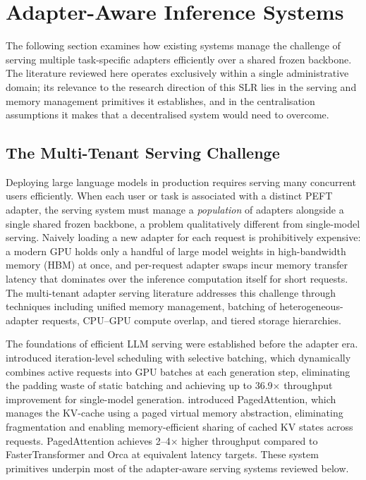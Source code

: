 \section{Adapter-Aware Inference Systems}
\label{sec:inference_systems}

The following section examines how existing systems manage the challenge of
serving multiple task-specific adapters efficiently over a shared frozen
backbone. The literature reviewed here operates exclusively within a single
administrative domain; its relevance to the research direction of this SLR
lies in the serving and memory management primitives it establishes, and in
the centralisation assumptions it makes that a decentralised system would
need to overcome.

\subsection{The Multi-Tenant Serving Challenge}
\label{sec:inference_systems:intro}

Deploying large language models in production requires serving many concurrent users
efficiently. When each user or task is associated with a distinct PEFT adapter, the
serving system must manage a \textit{population} of adapters alongside a single shared
frozen backbone, a problem qualitatively different from single-model serving.
Naively loading a new adapter for each request is prohibitively expensive: a modern
GPU holds only a handful of large model weights in high-bandwidth memory (HBM) at once,
and per-request adapter swaps incur memory transfer latency that dominates over the
inference computation itself for short requests. The multi-tenant adapter serving
literature addresses this challenge through techniques including unified memory
management, batching of heterogeneous-adapter requests, CPU--GPU compute overlap, and
tiered storage hierarchies.

The foundations of efficient LLM serving were established before the adapter era.
\citet{YuOrca2022} introduced iteration-level scheduling with selective batching, which dynamically
combines active requests into GPU batches at each generation step, eliminating the
padding waste of static batching and achieving up to 36.9$\times$ throughput improvement
for single-model generation. \citet{KwonPagedAttention2023} introduced PagedAttention,
which manages the KV-cache using a paged virtual memory abstraction, eliminating
fragmentation and enabling memory-efficient sharing of cached KV states across requests.
PagedAttention achieves 2--4$\times$ higher throughput compared to FasterTransformer and
Orca at equivalent latency targets.
These system primitives underpin most of the adapter-aware serving systems reviewed below.

